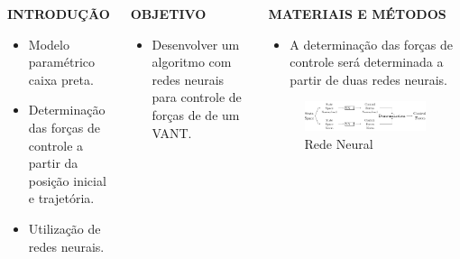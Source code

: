 \documentclass[serif,20pt]{beamer}
\begin{document}
\begin{frame}[t]
\begin{columns}[t]
\begin{block}{\centering\bfseries INTRODUÇÃO}
\vspace{1cm}
\begin{itemize}\justifying
    \item Modelo paramétrico caixa preta.
    \item Determinação das forças de controle a partir da posição inicial e trajetória.
    \item Utilização de redes neurais.
\end{itemize}
\vspace{1cm}
\end{block}
%
\begin{block}{\centering\bfseries OBJETIVO}
\vspace{1cm}
\begin{itemize}\justifying
    \item Desenvolver um algoritmo com redes neurais para controle de forças de de um VANT.
\end{itemize}
\vspace{1cm}
\end{block}
%
\begin{block}{\centering\bfseries MATERIAIS E MÉTODOS}
    \vspace{1cm}
\begin{itemize}\justifying
    \item A determinação das forças de controle será determinada a partir de duas redes neurais.
\end{itemize}
%
\begin{figure}[H]
    \centering
    \caption{Rede Neural}
    \includegraphics[width=\columnwidth]{../../../report/figures/3methodology/full_scheme.pdf}


\end{figure}
\end{block}
\end{columns}
\end{frame}
\end{document}
